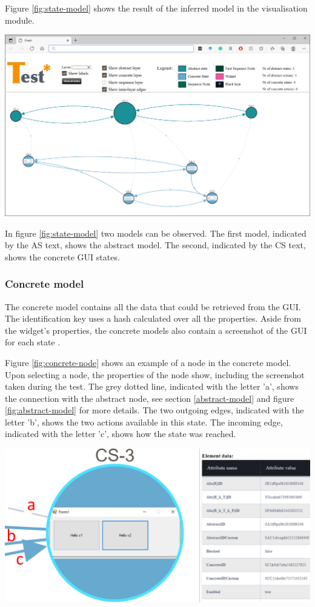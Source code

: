 Figure \ref{fig:state-model} shows the result of the inferred model in the visualisation module.

\bigskip
\begingroup
\captionsetup{type=figure}
\includegraphics[scale=0.38]{images/state-model.png}
\label{fig:state-model}
\endgroup

In figure \ref{fig:state-model} two models can be observed. The first model, indicated by the AS text, shows the abstract model. The second, indicated by the CS text, shows the concrete GUI states. 

\subsubsection{Concrete model}
The concrete model contains all the data that could be retrieved from the GUI. The identification key uses a hash calculated over all the properties. Aside from the widget's properties, the concrete models also contain a screenshot of the GUI for each state \cite{thesisMulders}.

Figure \ref{fig:concrete-node} shows an example of a node in the concrete model. Upon selecting a node, the properties of the node show, including the screenshot taken during the test. The grey dotted line, indicated with the letter 'a', shows the connection with the abstract node, see section \ref{abstract-model} and figure \ref{fig:abstract-model} for more details. The two outgoing edges, indicated with the letter 'b', shows the two actions available in this state. The incoming edge, indicated with the letter 'c', shows how the state was reached. 

\bigskip
\begingroup
\captionsetup{type=figure}
\includegraphics[scale=0.5]{images/concrete-model.png}
\label{fig:concrete-node}
\endgroup

